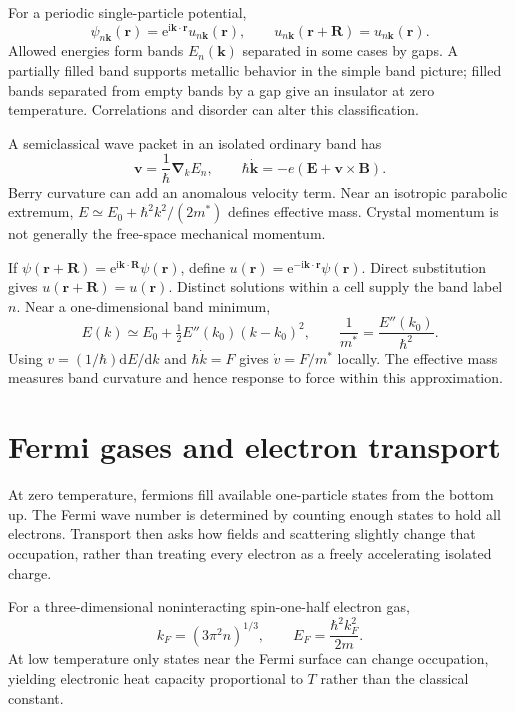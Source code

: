 \documentclass[11pt,oneside]{book}
\newcommand{\dd}{\mathrm{d}}
\newcommand{\ii}{\mathrm{i}}
\newcommand{\ee}{\mathrm{e}}
\newcommand{\vect}[1]{\boldsymbol{#1}}
\newcommand{\grad}{\boldsymbol{\nabla}}
\theoremstyle{reviewstyle}
\begin{document}
For a periodic single-particle potential,
\begin{equation}\psi_{n\vect k}(\vect r)=\ee^{\ii\vect k\cdot\vect r}u_{n\vect k}(\vect r),\qquad u_{n\vect k}(\vect r+\vect R)=u_{n\vect k}(\vect r).\end{equation}
Allowed energies form bands $E_n(\vect k)$ separated in some cases by gaps. A partially filled band supports metallic behavior in the simple band picture; filled bands separated from empty bands by a gap give an insulator at zero temperature. Correlations and disorder can alter this classification.

A semiclassical wave packet in an isolated ordinary band has
\begin{equation}\vect v=\frac1\hbar\grad_{\!k}E_n,\qquad \hbar\dot{\vect k}=-e(\vect E+\vect v\times\vect B).\end{equation}
Berry curvature can add an anomalous velocity term. Near an isotropic parabolic extremum, $E\simeq E_0+\hbar^2k^2/(2m^*)$ defines effective mass. Crystal momentum is not generally the free-space mechanical momentum.

If $\psi(\vect r+\vect R)=\ee^{\ii\vect k\cdot\vect R}\psi(\vect r)$, define $u(\vect r)=\ee^{-\ii\vect k\cdot\vect r}\psi(\vect r)$. Direct substitution gives $u(\vect r+\vect R)=u(\vect r)$. Distinct solutions within a cell supply the band label $n$. Near a one-dimensional band minimum,
\begin{equation}
E(k)\simeq E_0+\tfrac12E''(k_0)(k-k_0)^2,
\qquad \frac1{m^*}=\frac{E''(k_0)}{\hbar^2}.
\end{equation}
Using $v=(1/\hbar)\dd E/\dd k$ and $\hbar\dot k=F$ gives $\dot v=F/m^*$ locally. The effective mass measures band curvature and hence response to force within this approximation.

\section{Fermi gases and electron transport}
At zero temperature, fermions fill available one-particle states from the bottom up. The Fermi wave number is determined by counting enough states to hold all electrons. Transport then asks how fields and scattering slightly change that occupation, rather than treating every electron as a freely accelerating isolated charge.

For a three-dimensional noninteracting spin-one-half electron gas,
\begin{equation}k_F=(3\pi^2n)^{1/3},\qquad E_F=\frac{\hbar^2k_F^2}{2m}.\end{equation}
At low temperature only states near the Fermi surface can change occupation, yielding electronic heat capacity proportional to $T$ rather than the classical constant.
\end{document}
